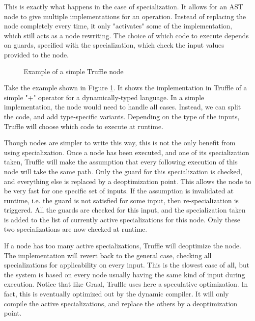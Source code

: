 \documentclass[twoside,11pt,a4paper]{article}
\begin{document}
This is exactly what happens in the case of specialization. It allows for an AST node to give multiple implementations for an operation. Instead of replacing the node completely every time, it only "activates" some of the implementation, which still acts as a node rewriting. The choice of which code to execute depends on guards, specified with the specialization, which check the input values provided to the node.

\begin{figure}[t]
	
	\caption{Example of a simple Truffle node}
	\label{fig:truffleaddnode}
\end{figure}

Take the example shown in Figure \ref{fig:truffleaddnode}. It shows the implementation in Truffle of a simple "+" operator for a dynamically-typed language. In a simple implementation, the node would need to handle all cases. Instead, we can split the code, and add type-specific variants. Depending on the type of the inputs, Truffle will choose which code to execute at runtime.

Though nodes are simpler to write this way, this is not the only benefit from using specialization. Once a node has been executed, and one of its specialization taken, Truffle will make the assumption that every following execution of this node will take the same path. Only the guard for this specialization is checked, and everything else is replaced by a deoptimization point. This allows the node to be very fast for one specific set of inputs. If the assumption is invalidated at runtime, i.e. the guard is not satisfied for some input, then re-specialization is triggered. All the guards are checked for this input, and the specialization taken is added to the list of currently active specializations for this node. Only these two specializations are now checked at runtime.

If a node has too many active specializations, Truffle will deoptimize the node. The implementation will revert back to the general case, checking all specializations for applicability on every input. This is the slowest case of all, but the system is based on every node usually having the same kind of input during execution. Notice that like Graal, Truffle uses here a speculative optimization. In fact, this is eventually optimized out by the dynamic compiler. It will only compile the active specializations, and replace the others by a deoptimization point.
\end{document}
